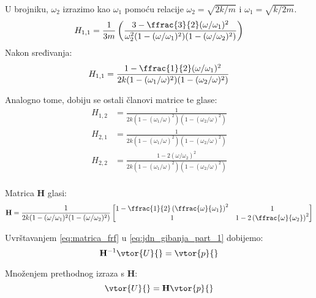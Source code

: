 U brojniku, $\omega_2$ izrazimo kao $\omega_1$ pomoću relacije $\omega_2=\sqrt{2k/m}$
i $\omega_1=\sqrt{k/2m}$.
\[
    \begin{aligned}
        H_{1,1}=
        \frac{1}{3m}
            \left(
                \frac{3-\ffrac{3}{2}(\omega/\omega_1)^2}
                    {\omega_2^2(1-(\omega/\omega_1)^2)(1-(\omega/\omega_2)^2)}
            \right)
    \end{aligned}
\]
Nakon sređivanja:
\begin{equation}\label{eq:frf_11}
    H_{1,1}=\frac{1-\ffrac{1}{2}(\omega/\omega_1)^2}{2k(1-(\omega_1/\omega)^2)(1-(\omega_2/\omega)^2)}
\end{equation}

Analogno tome, dobiju se ostali članovi matrice te glase:
\begin{align}
    H_{1,2} &= \frac{1}{2k(1-(\omega_1/\omega)^2)(1-(\omega_2/\omega)^2)}\label{eq:frf_12}\\
    H_{2,1} &= \frac{1}{2k(1-(\omega_1/\omega)^2)(1-(\omega_2/\omega)^2)}\label{eq:frf_21}\\
    H_{2,2} &= \frac{1-2(\omega/\omega_2)^2}{2k(1-(\omega_1/\omega)^2)(1-(\omega_2/\omega)^2)}\label{eq:frf_22}\\
\end{align}

Matrica $\mathbf{H}$ glasi:
\begin{equation}\label{eq:matrica_frf}
    \mathbf{H}=\frac{1}{2k(1-(\omega/\omega_1)^2(1-(\omega/\omega_2)^2)}
    \begin{bmatrix}
        1-\ffrac{1}{2}\left(\ffrac{\omega}{\omega_1}\right)^2 & 1 \\
        1 & 1-2\left(\ffrac{\omega}{\omega_2}\right)^2
    \end{bmatrix}
\end{equation}

Uvrštavanjem \eqref{eq:matrica_frf} u \eqref{eq:jdn_gibanja_part_1} dobijemo:
\begin{equation}
    \mathbf{H}^{-1}\vtor{U}{}=\vtor{p}{}
\end{equation}

Množenjem prethodnog izraza s $\mathbf{H}$:
\begin{equation}
    \vtor{U}{} = \mathbf{H}\vtor{p}{}
\end{equation}

